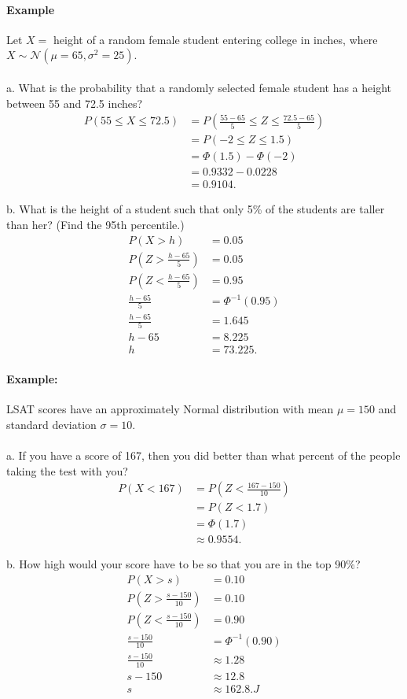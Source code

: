 \paragraph*{Example}
Let $X=$ height of a random female student entering college in inches, where $X \sim \mathcal{N}(\mu=65, \sigma^2=25)$.\\
\\
a. What is the probability that a randomly selected female student has a height between 55 and 72.5 inches?
\begin{align*}
    P(55 \leq X \leq 72.5) &= P\left(\frac{55 - 65}{5} \leq Z \leq \frac{72.5 - 65}{5}\right) \\
    &= P(-2 \leq Z \leq 1.5) \\
    &= \Phi(1.5) - \Phi(-2) \\
    &= 0.9332 - 0.0228 \\
    &= 0.9104.
\end{align*}

b. What is the height of a student such that only 5\% of the students are taller than her? (Find the 95th percentile.)
\begin{align*}
    P(X > h) &= 0.05 \\
    P\left(Z > \frac{h - 65}{5}\right) &= 0.05 \\
    P\left(Z < \frac{h - 65}{5}\right) &= 0.95 \\
    \frac{h - 65}{5} &= \Phi^{-1}(0.95) \\
    \frac{h - 65}{5} &= 1.645 \\
    h - 65 &= 8.225 \\
    h &= 73.225.
\end{align*}

\pagebreak

\paragraph*{Example:}
LSAT scores have an approximately Normal distribution with mean $\mu = 150$ and standard deviation $\sigma = 10$.\\
\\
a. If you have a score of 167, then you did better than what percent of the people taking the test with you?
\begin{align*}
    P(X < 167) &= P\left(Z < \frac{167 - 150}{10}\right) \\
    &= P(Z < 1.7) \\
    &= \Phi(1.7) \\
    &\approx 0.9554.
\end{align*}

b. How high would your score have to be so that you are in the top 90\%?
\begin{align*}
    P(X > s) &= 0.10 \\
    P\left(Z > \frac{s - 150}{10}\right) &= 0.10 \\
    P\left(Z < \frac{s - 150}{10}\right) &= 0.90 \\
    \frac{s - 150}{10} &= \Phi^{-1}(0.90) \\
    \frac{s - 150}{10} &\approx 1.28 \\
    s - 150 &\approx 12.8 \\
    s &\approx 162.8.J
\end{align*}
